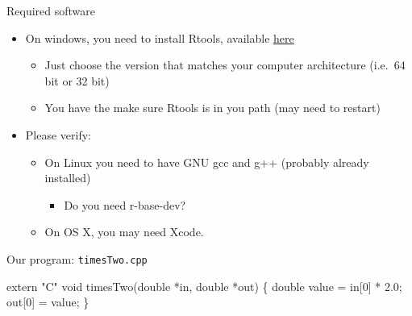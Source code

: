 \documentclass[ignorenonframetext,]{beamer}
\newenvironment{Shaded}{\begin{snugshade}}{\end{snugshade}}
\newcommand{\DataTypeTok}[1]{\textcolor[rgb]{0.13,0.29,0.53}{{#1}}}
\newcommand{\DecValTok}[1]{\textcolor[rgb]{0.00,0.00,0.81}{{#1}}}
\newcommand{\FloatTok}[1]{\textcolor[rgb]{0.00,0.00,0.81}{{#1}}}
\newcommand{\StringTok}[1]{\textcolor[rgb]{0.31,0.60,0.02}{{#1}}}
\newcommand{\NormalTok}[1]{{#1}}
\providecommand{\tightlist}{%
\setlength{\itemsep}{0pt}\setlength{\parskip}{0pt}}
\begin{document}
\begin{frame}{Required software}

\begin{itemize}
\tightlist
\item
  On windows, you need to install Rtools, available
  \href{https://cran.r-project.org/bin/windows/Rtools/}{here}

  \begin{itemize}
  \tightlist
  \item
    Just choose the version that matches your computer architecture
    (i.e.~64 bit or 32 bit)
  \item
    You have the make sure Rtools is in you path (may need to restart)
  \end{itemize}
\item
  Please verify:

  \begin{itemize}
  \tightlist
  \item
    On Linux you need to have GNU gcc and g++ (probably already
    installed)

    \begin{itemize}
    \tightlist
    \item
      Do you need r-base-dev?
    \end{itemize}
  \item
    On OS X, you may need Xcode.
  \end{itemize}
\end{itemize}

\end{frame}

\begin{frame}[fragile]{Our program: \texttt{timesTwo.cpp}}

\Large

\begin{Shaded}
\begin{Highlighting}[]
\DataTypeTok{extern} \StringTok{"C"} \DataTypeTok{void}
  \NormalTok{timesTwo(}\DataTypeTok{double} \NormalTok{*in, }\DataTypeTok{double} \NormalTok{*out)}
\NormalTok{\{}
  \DataTypeTok{double} \NormalTok{value = in[}\DecValTok{0}\NormalTok{] * }\FloatTok{2.0}\NormalTok{;}
    \NormalTok{out[}\DecValTok{0}\NormalTok{] = value;}
\NormalTok{\}}
\end{Highlighting}
\end{Shaded}

\end{frame}
\end{document}
